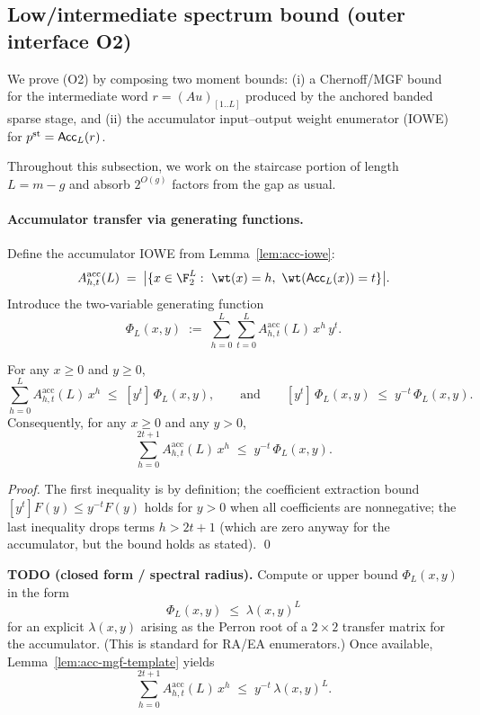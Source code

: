 \subsection{Low/intermediate spectrum bound (outer interface O2)}
\label{subsec:outer-ea-spectrum}

We prove (O2) by composing two moment bounds:
(i) a Chernoff/MGF bound for the intermediate word $r=(Au)_{[1..L]}$ produced by the anchored banded sparse stage, and
(ii) the accumulator input--output weight enumerator (IOWE) for $p^{\mathrm{st}}={\sf Acc}_L(r)$.

Throughout this subsection, we work on the staircase portion of length $L=m-g$ and absorb $2^{O(g)}$ factors from the gap
as usual.

\paragraph{Accumulator transfer via generating functions.}
Define the accumulator IOWE from Lemma~\ref{lem:acc-iowe}:
\[
A^{\mathrm{acc}}_{h,t}(L)
\;=\;
\big|\{x\in\F_2^L:\ \wt(x)=h,\ \wt({\sf Acc}_L(x))=t\}\big|.
\]
Introduce the two-variable generating function
\[
\Phi_L(x,y)
\;:=\;
\sum_{h=0}^{L}\sum_{t=0}^{L} A^{\mathrm{acc}}_{h,t}(L)\, x^{h}\, y^{t}.
\]

\begin{lemma}
\label{lem:acc-mgf-template}
For any $x\ge 0$ and $y\ge 0$,
\[
\sum_{h=0}^{L} A^{\mathrm{acc}}_{h,t}(L)\, x^{h}
\;\le\;
[y^t]\,\Phi_L(x,y),
\qquad
\text{and}\qquad
[y^t]\,\Phi_L(x,y)\;\le\; y^{-t}\,\Phi_L(x,y).
\]
Consequently, for any $x\ge 0$ and any $y>0$,
\[
\sum_{h=0}^{2t+1} A^{\mathrm{acc}}_{h,t}(L)\, x^{h}
\;\le\;
y^{-t}\,\Phi_L(x,y).
\]
\end{lemma}

\begin{proof}
The first inequality is by definition; the coefficient extraction bound $[y^t]F(y)\le y^{-t}F(y)$ holds for $y>0$ when
all coefficients are nonnegative; the last inequality drops terms $h>2t+1$ (which are zero anyway for the accumulator, but
the bound holds as stated). \qed
\end{proof}

\noindent\textbf{TODO (closed form / spectral radius).}
Compute or upper bound $\Phi_L(x,y)$ in the form
\[
\Phi_L(x,y)\;\le\; \lambda(x,y)^{L}
\]
for an explicit $\lambda(x,y)$ arising as the Perron root of a $2\times 2$ transfer matrix for the accumulator.
(This is standard for RA/EA enumerators.)
Once available, Lemma~\ref{lem:acc-mgf-template} yields
\[
\sum_{h=0}^{2t+1} A^{\mathrm{acc}}_{h,t}(L)\, x^{h}
\;\le\;
y^{-t}\,\lambda(x,y)^{L}.
\]

